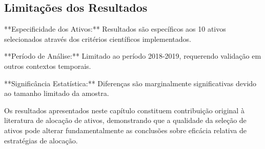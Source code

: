 \subsection{Limitações dos Resultados}

**Especificidade dos Ativos:** Resultados são específicos aos 10 ativos selecionados através dos critérios científicos implementados.

**Período de Análise:** Limitado ao período 2018-2019, requerendo validação em outros contextos temporais.

**Significância Estatística:** Diferenças são marginalmente significativas devido ao tamanho limitado da amostra.

Os resultados apresentados neste capítulo constituem contribuição original à literatura de alocação de ativos, demonstrando que a qualidade da seleção de ativos pode alterar fundamentalmente as conclusões sobre eficácia relativa de estratégias de alocação.